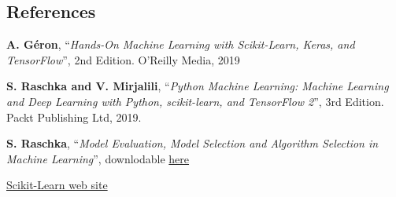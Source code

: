 \documentclass[11pt]{article}
\begin{document}
    \hypertarget{references}{%
\subsection{References}\label{references}}

    \textbf{A. Géron}, ``\emph{Hands-On Machine Learning with Scikit-Learn,
Keras, and TensorFlow}'', 2nd Edition. O'Reilly Media, 2019

\textbf{S. Raschka and V. Mirjalili}, ``\emph{Python Machine Learning:
Machine Learning and Deep Learning with Python, scikit-learn, and
TensorFlow 2}'', 3rd Edition. Packt Publishing Ltd, 2019.

\textbf{S. Raschka}, ``\emph{Model Evaluation, Model Selection and
Algorithm Selection in Machine Learning}'', downlodable
\href{https://arxiv.org/pdf/1811.12808.pdf}{here}

\href{https://scikit-learn.org/}{Scikit-Learn web site}


    
    
    
\end{document}
